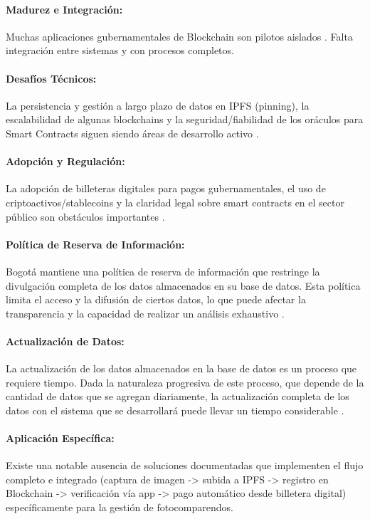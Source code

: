 \paragraph{Madurez e Integración:}
Muchas aplicaciones gubernamentales de Blockchain son pilotos aislados \parencite{zheng2018blockchain,li2021overview}. Falta integración entre sistemas y con procesos completos. 

\paragraph{Desafíos Técnicos: }
La persistencia y gestión a largo plazo de datos en IPFS (pinning), la escalabilidad de algunas blockchains y la seguridad/fiabilidad de los oráculos para Smart Contracts siguen siendo áreas de desarrollo activo \parencite{zheng2018blockchain}. 

\paragraph{Adopción y Regulación:}
La adopción de billeteras digitales para pagos gubernamentales, el uso de criptoactivos/stablecoins y la claridad legal sobre smart contracts en el sector público son obstáculos importantes \parencite{tan2022blockchain}.

\paragraph{Política de Reserva de Información:}
 Bogotá mantiene una política de reserva de información que restringe la divulgación completa de los datos almacenados en su base de datos. Esta política limita el acceso y la difusión de ciertos datos, lo que puede afectar la transparencia y la capacidad de realizar un análisis exhaustivo \parencite{choquevilca2024blockchain}.

\paragraph{Actualización de Datos:}
La actualización de los datos almacenados en la base de datos es un proceso que requiere tiempo. Dada la naturaleza progresiva de este proceso, que depende de la cantidad de datos que se agregan diariamente, la actualización completa de los datos con el sistema que se desarrollará puede llevar un tiempo considerable \parencite{choquevilca2024blockchain}. 

\paragraph{Aplicación Específica:}
Existe una notable ausencia de soluciones documentadas que implementen el flujo completo e integrado (captura de imagen -> subida a IPFS -> registro en Blockchain -> verificación vía app -> pago automático desde billetera digital) específicamente para la gestión de fotocomparendos. \parencite{yousfi2022its, chen2024blockchain}


